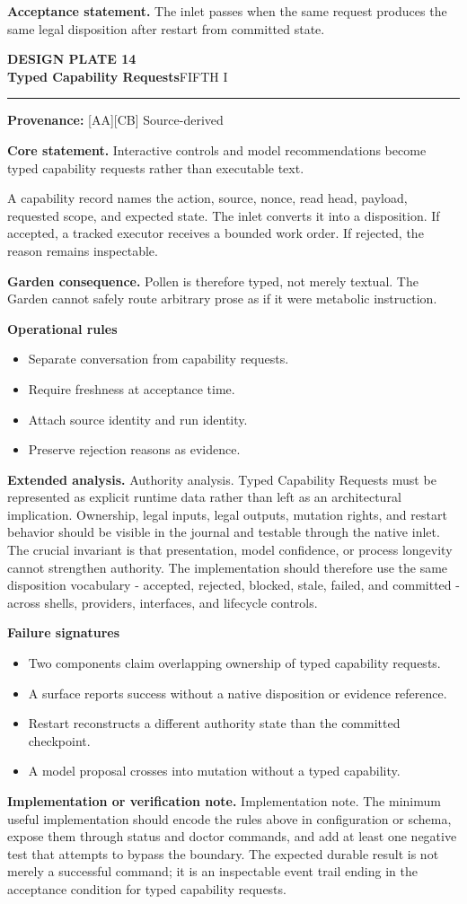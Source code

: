 \documentclass[10pt,letterpaper,oneside]{article}
\newcommand{\prov}[1]{\textcolor{gardenBlue}{\sffamily\footnotesize\textbf{Provenance:} #1}}
\newcommand{\platetitle}[3]{%
  \begin{minipage}[t][0.54in][t]{\textwidth}
  {\sffamily\bfseries\color{gardenDeep}\fontsize{9}{10}\selectfont DESIGN PLATE #1}\\[-1pt]
  {\sffamily\bfseries\color{gardenInk}\fontsize{16.5}{18}\selectfont #2}\hfill{\sffamily\color{gardenGreen}\large #3}
  \end{minipage}\vspace{-2pt}\hrule\vspace{5pt}}
\begin{document}
\begin{acceptbox}
\textbf{Acceptance statement.} The inlet passes when the same request produces the same legal disposition after restart from committed state.
\end{acceptbox}
\newpage
\platetitle{14}{Typed Capability Requests}{FIFTH I}
\prov{[AA][CB] Source-derived}
\fontsize{8.85}{10.45}\selectfont
\begin{corebox}
\textbf{Core statement.} Interactive controls and model recommendations become typed capability requests rather than executable text.
\end{corebox}
A capability record names the action, source, nonce, read head, payload, requested scope, and expected state. The inlet converts it into a disposition. If accepted, a tracked executor receives a bounded work order. If rejected, the reason remains inspectable.

\textbf{Garden consequence.} Pollen is therefore typed, not merely textual. The Garden cannot safely route arbitrary prose as if it were metabolic instruction.

\textbf{Operational rules}
\begin{itemize}
\item Separate conversation from capability requests.
\item Require freshness at acceptance time.
\item Attach source identity and run identity.
\item Preserve rejection reasons as evidence.
\end{itemize}
\textbf{Extended analysis.} Authority analysis. Typed Capability Requests must be represented as explicit runtime data rather than left as an architectural implication. Ownership, legal inputs, legal outputs, mutation rights, and restart behavior should be visible in the journal and testable through the native inlet. The crucial invariant is that presentation, model confidence, or process longevity cannot strengthen authority. The implementation should therefore use the same disposition vocabulary - accepted, rejected, blocked, stale, failed, and committed - across shells, providers, interfaces, and lifecycle controls.

\textbf{Failure signatures}
\begin{itemize}
\item Two components claim overlapping ownership of typed capability requests.
\item A surface reports success without a native disposition or evidence reference.
\item Restart reconstructs a different authority state than the committed checkpoint.
\item A model proposal crosses into mutation without a typed capability.
\end{itemize}
\textbf{Implementation or verification note.} Implementation note. The minimum useful implementation should encode the rules above in configuration or schema, expose them through status and doctor commands, and add at least one negative test that attempts to bypass the boundary. The expected durable result is not merely a successful command; it is an inspectable event trail ending in the acceptance condition for typed capability requests.
\end{document}
